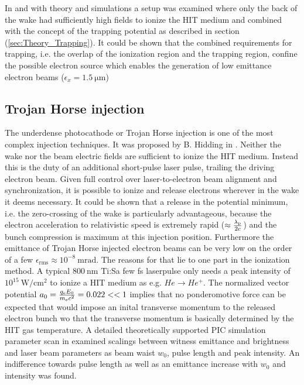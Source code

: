In \cite{Ossa_Rake_PRL2013} and \cite{MartinezdelaOssa2014231} with theory and simulations a setup was examined where only the back of the wake had sufficiently high fields to ionize the HIT medium and combined with the concept of the trapping potential as described in section (\ref{sec:Theory_Trapping}). It could be shown that the combined requirements for trapping, i.e. the overlap of the ionization region and the trapping region, confine the possible electron source which enables the generation of low emittance electron beams ($\epsilon_x=1.5\ \mathrm{\mu m}$) 





\subsection{Trojan Horse injection}
\label{sec:Theory_TrojanHorse}
The underdense photocathode or Trojan Horse injection is one of the most complex injection techniques. It was proposed by B. Hidding in \cite{Hidding_PRL_2012}. Neither the wake nor the beam electric fields are sufficient to ionize the HIT medium. Instead this is the duty of an additional short-pulse laser pulse, trailing the driving electron beam. Given full control over laser-to-electron beam alignment and synchronization, it is possible to ionize and release electrons wherever in the wake it deems necessary. It could be shown that a release in the potential minimum, i.e. the zero-crossing of the wake is particularly advantageous, because the electron acceleration to relativistic speed is extremely rapid ($\approx \frac{\lambda_\mathrm{p}}{2c}$) and the bunch compression is maximum at this injection position. Furthermore the emittance of Trojan Horse injected electron beams can be very low on the order of a few $\epsilon_\mathrm{rms}\approx 10^{-8}\ \mathrm{m rad}$. The reasons for that lie to one part in the ionization method. A typical $800\ \mathrm{nm}$ Ti:Sa few fs laserpulse only needs a peak intensity of $10^{15}\ \mathrm{W/cm^2}$ to ionize a HIT medium as e.g. $He \rightarrow He^+$. The normalized vector potential $a_0 = \frac{q_\mathrm{e} E_0}{m_\mathrm{e} c^2} = 0.022<<1$ implies that no ponderomotive force can be expected that would impose an inital transverse momentum to the released electron bunch wo that the transverse momentum is basically determined by the HIT gas temperature. 
A detailed theoretically supported PIC simulation parameter scan in \cite{xi2013hybrid} examined scalings between witness emittance and brightness and laser beam parameters as beam waist $w_0$, pulse length and peak intensity. An indifference towards pulse length as well as an emittance increase with $w_0$ and intensity was found.

